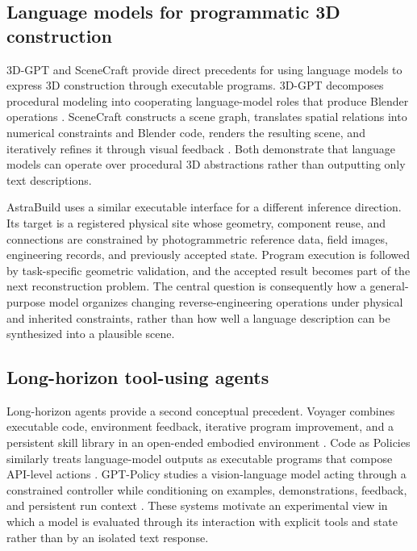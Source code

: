 \documentclass[10pt,a4paper]{article}
\begin{document}
\hypertarget{language-models-for-programmatic-3d-construction}{%
\subsection{Language models for programmatic 3D
construction}\label{language-models-for-programmatic-3d-construction}}

3D-GPT and SceneCraft provide direct precedents for using language
models to express 3D construction through executable programs. 3D-GPT
decomposes procedural modeling into cooperating language-model roles
that produce Blender operations \citep{sun2023threegpt}. SceneCraft
constructs a scene graph, translates spatial relations into numerical
constraints and Blender code, renders the resulting scene, and
iteratively refines it through visual feedback \citep{hu2024scenecraft}.
Both demonstrate that language models can operate over procedural 3D
abstractions rather than outputting only text descriptions.

AstraBuild uses a similar executable interface for a different inference
direction. Its target is a registered physical site whose geometry,
component reuse, and connections are constrained by photogrammetric
reference data, field images, engineering records, and previously
accepted state. Program execution is followed by task-specific geometric
validation, and the accepted result becomes part of the next
reconstruction problem. The central question is consequently how a
general-purpose model organizes changing reverse-engineering operations
under physical and inherited constraints, rather than how well a
language description can be synthesized into a plausible scene.

\hypertarget{long-horizon-tool-using-agents}{%
\subsection{Long-horizon tool-using
agents}\label{long-horizon-tool-using-agents}}

Long-horizon agents provide a second conceptual precedent. Voyager
combines executable code, environment feedback, iterative program
improvement, and a persistent skill library in an open-ended embodied
environment \citep{wang2023voyager}. Code as Policies similarly treats
language-model outputs as executable programs that compose API-level
actions \citep{liang2023code}. GPT-Policy studies a vision-language
model acting through a constrained controller while conditioning on
examples, demonstrations, feedback, and persistent run context
\citep{cheng2026gptpolicy}. These systems motivate an experimental view
in which a model is evaluated through its interaction with explicit
tools and state rather than by an isolated text response.
\end{document}

